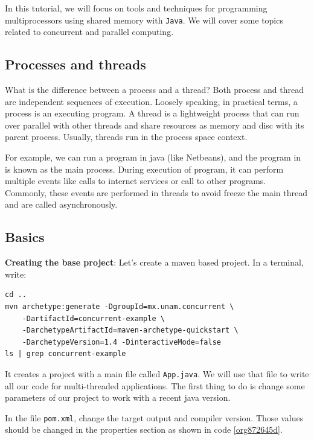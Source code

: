 \documentclass{latex/classes/thesis}
\begin{document}
In this tutorial, we will focus on tools and techniques for programming
multiprocessors using shared memory with \texttt{Java}. We will cover some topics
related to concurrent and parallel computing.


\subsection{Processes and threads}
\label{sec:org984bdd8}

What is the difference between a process and a thread? Both process and
thread are independent sequences of execution. Loosely speaking, in practical
terms, a process is an executing program. A thread is a lightweight process
that can run over parallel with other threads and share resources as memory
and disc with its parent process. Usually, threads run in the process space
context.

For example, we can run a program in java (like Netbeans), and the
program in is known as the main process. During execution of program, it
can perform multiple events like calls to internet services or call to other
programs. Commonly, these events are performed in threads to avoid freeze the
main thread and are called asynchronously.

\subsection{Basics}
\label{sec:org5f04900}


\textbf{Creating the base project}: Let's create a maven based project. In a terminal,
write:

\begin{lstlisting}
cd ..
mvn archetype:generate -DgroupId=mx.unam.concurrent \
    -DartifactId=concurrent-example \
    -DarchetypeArtifactId=maven-archetype-quickstart \
    -DarchetypeVersion=1.4 -DinteractiveMode=false
ls | grep concurrent-example
\end{lstlisting}

It creates a project with a main file called \texttt{App.java}. We will use that file
to write all our code for multi-threaded applications. The first thing to do
is change some parameters of our project to work with a recent java version.

In the file \texttt{pom.xml}, change the target output and compiler version. Those
values should be changed in the properties section as shown in code
\ref{org872645d}.
\end{document}
